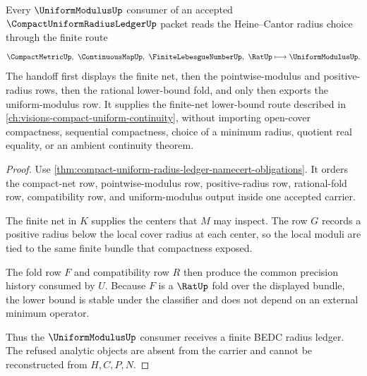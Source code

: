 \begin{theorem}
\label{thm:compact-uniform-radius-ledger-heine-cantor-handoff}
Every $\UniformModulusUp$ consumer of an accepted $\CompactUniformRadiusLedgerUp$ packet reads the Heine--Cantor radius choice through the finite route
$$
\CompactMetricUp,\ \ContinuousMapUp,\ \FiniteLebesgueNumberUp,\ \RatUp
\longmapsto
\UniformModulusUp .
$$
The handoff first displays the finite net, then the pointwise-modulus and positive-radius rows, then the rational lower-bound fold, and only then exports the uniform-modulus row. It supplies the finite-net lower-bound route described in \autoref{ch:visions-compact-uniform-continuity}, without importing open-cover compactness, sequential compactness, choice of a minimum radius, quotient real equality, or an ambient continuity theorem.
\end{theorem}
\begin{proof}
Use \autoref{thm:compact-uniform-radius-ledger-namecert-obligations}. It orders the compact-net row, pointwise-modulus row, positive-radius row, rational-fold row, compatibility row, and uniform-modulus output inside one accepted carrier.

The finite net in $K$ supplies the centers that $M$ may inspect. The row $G$ records a positive radius below the local cover radius at each center, so the local moduli are tied to the same finite bundle that compactness exposed.

The fold row $F$ and compatibility row $R$ then produce the common precision history consumed by $U$. Because $F$ is a $\RatUp$ fold over the displayed bundle, the lower bound is stable under the classifier and does not depend on an external minimum operator.

Thus the $\UniformModulusUp$ consumer receives a finite BEDC radius ledger. The refused analytic objects are absent from the carrier and cannot be reconstructed from $H,C,P,N$.
\end{proof}


